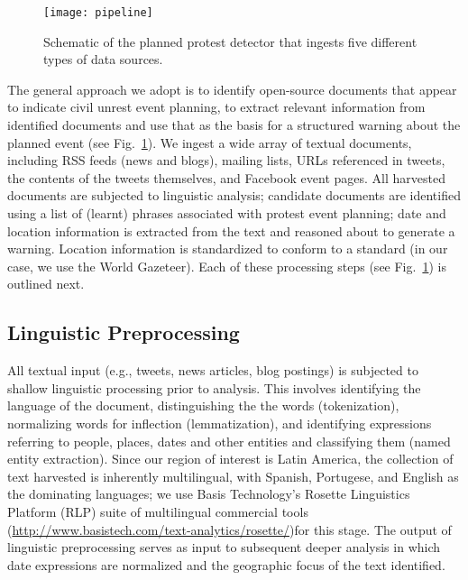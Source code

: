 \begin{figure}
\texttt{[image: pipeline]}
\caption{Schematic of the planned protest detector that ingests five
different types of data sources.}
\label{flowchart}
\end{figure}
The general approach we adopt is to identify open-source documents
that appear to indicate civil unrest event planning, to extract
relevant information from identified documents and use that as the
basis for a structured warning about the planned event (see Fig.~\ref{flowchart}).
We ingest a
wide array of textual documents, including RSS feeds (news and blogs),
mailing lists, URLs referenced in tweets, the contents of the tweets themselves,
and Facebook event pages.
All harvested documents are subjected to linguistic analysis; candidate
documents are identified using a list of (learnt) phrases associated with
protest event planning; date and location information is extracted from the
text and reasoned about to generate a warning. Location information is standardized
to conform to a standard (in our case, we use the World Gazeteer).
Each of these processing
steps (see Fig.~\ref{flowchart}) is outlined next.

\subsection{Linguistic Preprocessing}
All textual input (e.g., tweets, news articles, blog postings) is
subjected to shallow linguistic processing prior to analysis.  This
involves identifying the language of the document, distinguishing the
the words (tokenization), normalizing words for inflection
(lemmatization), and identifying expressions referring to people,
places, dates and other entities and classifying them (named entity extraction). 
Since our region of interest is Latin America, the collection of text
harvested is inherently multilingual, with Spanish, Portugese, and English as
the dominating languages;
we use Basis Technology's Rosette Linguistics Platform (RLP) suite of multilingual commercial tools (\url{http://www.basistech.com/text-analytics/rosette/})for this stage.
The output of linguistic preprocessing serves as input to subsequent deeper analysis in which 
date expressions are normalized and the geographic focus of the text identified.


